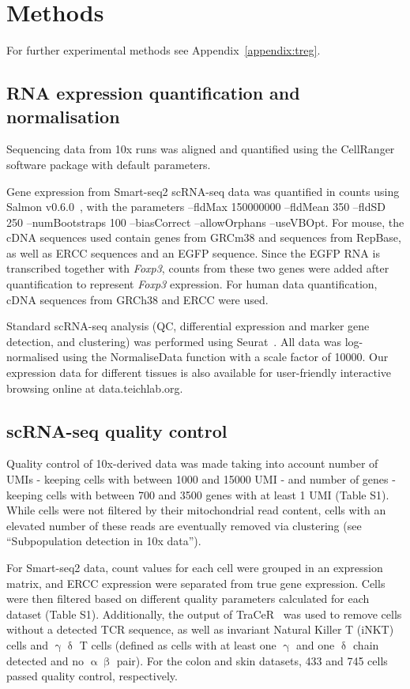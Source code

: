 \section{Methods}
\label{section2.9}

For further experimental methods see Appendix~\ref{appendix:treg}.

\subsection{RNA expression quantification and normalisation}
Sequencing data from 10x runs was aligned and quantified using the CellRanger software package with default parameters.

Gene expression from Smart-seq2 scRNA-seq data was quantified in counts using Salmon v0.6.0~\citep{Patro2017-ce}, with the parameters --fldMax 150000000 --fldMean 350 --fldSD 250 --numBootstraps 100 --biasCorrect --allowOrphans --useVBOpt. For mouse, the cDNA sequences used contain genes from GRCm38 and sequences from RepBase, as well as ERCC sequences and an EGFP sequence. Since the EGFP RNA is transcribed together with \textit{Foxp3}, counts from these two genes were added after quantification to represent \textit{Foxp3} expression. For human data quantification, cDNA sequences from GRCh38 and ERCC were used.

Standard scRNA-seq analysis (QC, differential expression and marker gene detection, and clustering) was performed using Seurat~\citep{Satija2015-ti}. All data was log-normalised using the NormaliseData function with a scale factor of 10000. Our expression data for different tissues is also available for user-friendly interactive browsing online at data.teichlab.org.

\subsection{scRNA-seq quality control}
Quality control of 10x-derived data was made taking into account number of UMIs - keeping cells with between 1000 and 15000 UMI - and number of genes - keeping cells with between 700 and 3500 genes with at least 1 UMI (Table S1). While cells were not filtered by their mitochondrial read content, cells with an elevated number of these reads are eventually removed via clustering (see “Subpopulation detection in 10x data”).

For Smart-seq2 data, count values for each cell were grouped in an expression matrix, and ERCC expression were separated from true gene expression. Cells were then filtered based on different quality parameters calculated for each dataset (Table S1). Additionally, the output of TraCeR~\citep{stubbington_t_2016} was used to remove cells without a detected TCR sequence, as well as invariant Natural Killer T (iNKT) cells and ${\upgamma\updelta}$ T cells (defined as cells with at least one ${\upgamma}$ and one ${\updelta}$ chain detected and no ${\upalpha\upbeta}$ pair). For the colon and skin datasets, 433 and 745 cells passed quality control, respectively.

